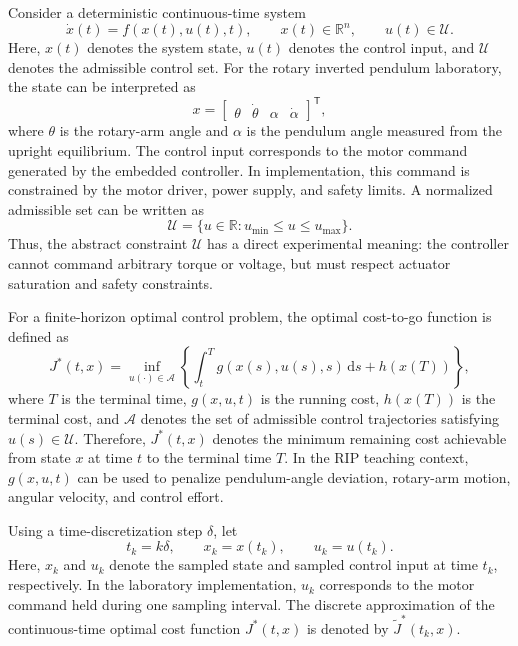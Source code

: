 \documentclass[11pt]{article}
\begin{document}
Consider a deterministic continuous-time system
\begin{equation}
\dot{x}(t)=f(x(t),u(t),t),
\qquad x(t)\in\mathbb{R}^{n},
\qquad u(t)\in\mathcal{U}.
\label{eq:ct_system}
\end{equation}
Here, $x(t)$ denotes the system state, $u(t)$ denotes the control input, and $\mathcal{U}$ denotes the admissible control set. For the rotary inverted pendulum laboratory, the state can be interpreted as
\begin{equation}
x=
\begin{bmatrix}
\theta & \dot{\theta} & \alpha & \dot{\alpha}
\end{bmatrix}^{\mathsf T},
\label{eq:rip_state_cont}
\end{equation}
where $\theta$ is the rotary-arm angle and $\alpha$ is the pendulum angle measured from the upright equilibrium. The control input corresponds to the motor command generated by the embedded controller. In implementation, this command is constrained by the motor driver, power supply, and safety limits. A normalized admissible set can be written as
\begin{equation}
\mathcal{U}=\{u\in\mathbb{R}:u_{\min}\leq u\leq u_{\max}\}.
\label{eq:control_set_theory}
\end{equation}
Thus, the abstract constraint $\mathcal{U}$ has a direct experimental meaning: the controller cannot command arbitrary torque or voltage, but must respect actuator saturation and safety constraints.

For a finite-horizon optimal control problem, the optimal cost-to-go function is defined as
\begin{equation}
J^{*}(t,x)=
\inf_{u(\cdot)\in\mathcal{A}}
\left\{
\int_{t}^{T} g(x(s),u(s),s)\,\mathrm{d}s
+h(x(T))
\right\},
\label{eq:finite_horizon_value}
\end{equation}
where $T$ is the terminal time, $g(x,u,t)$ is the running cost, $h(x(T))$ is the terminal cost, and $\mathcal{A}$ denotes the set of admissible control trajectories satisfying $u(s)\in\mathcal{U}$. Therefore, $J^{*}(t,x)$ denotes the minimum remaining cost achievable from state $x$ at time $t$ to the terminal time $T$. In the RIP teaching context, $g(x,u,t)$ can be used to penalize pendulum-angle deviation, rotary-arm motion, angular velocity, and control effort.

Using a time-discretization step $\delta$, let
\begin{equation}
t_k=k\delta,
\qquad x_k=x(t_k),
\qquad u_k=u(t_k).
\label{eq:sample_notation}
\end{equation}
Here, $x_k$ and $u_k$ denote the sampled state and sampled control input at time $t_k$, respectively. In the laboratory implementation, $u_k$ corresponds to the motor command held during one sampling interval. The discrete approximation of the continuous-time optimal cost function $J^{*}(t,x)$ is denoted by $\widetilde{J}^{*}(t_k,x)$.
\end{document}
